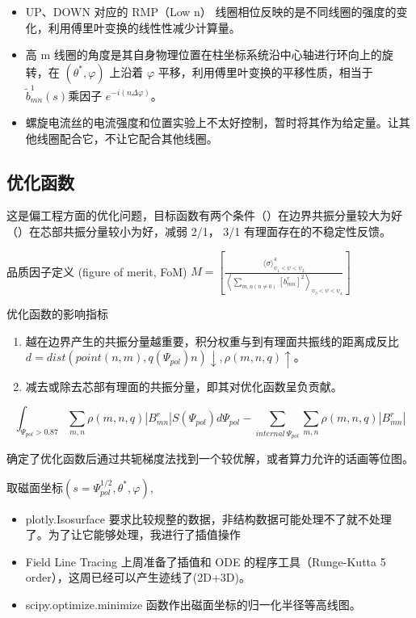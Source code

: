   \begin{itemize}
    \item UP、DOWN 对应的 RMP（Low n） 线圈相位反映的是不同线圈的强度的变化，利用傅里叶变换的线性性减少计算量。
    \item 高 m 线圈的角度是其自身物理位置在柱坐标系统沿中心轴进行环向上的旋转，在 $(\theta^*, \varphi)$ 上沿着 $\varphi$ 平移，利用傅里叶变换的平移性质，相当于$\tilde{b}_{m n}^{1}(s)$乘因子 $e^{-i\left(n \Delta\varphi \right )}$。
    \item 螺旋电流丝的电流强度和位置实验上不太好控制，暂时将其作为给定量。让其他线圈配合它，不让它配合其他线圈。 
  \end{itemize}  
  


\subsection{优化函数}

    
    这是偏工程方面的优化问题，目标函数有两个条件（）在边界共振分量较大为好（）在芯部共振分量较小为好，减弱 2/1， 3/1 有理面存在的不稳定性反馈。
    
  品质因子定义 (figure of merit, FoM) $M=\left[\frac{\langle\sigma\rangle_{\psi_{1}<\psi<\psi_{2}}^{4}}{\left\langle\sum_{m, n(n \neq 0)}\left[b_{m n}^{r}\right]^{2}\right\rangle_{\psi_{3}<\psi<\psi_{4}}}\right]$
    
  优化函数的影响指标
  \begin{enumerate}
    \item 越在边界产生的共振分量越重要，积分权重与到有理面共振线的距离成反比 $d=dist(point(n,m),q(\Psi_{pol})n)\downarrow, \rho(m,n,q) \uparrow$。
    \item 减去或除去芯部有理面的共振分量，即其对优化函数呈负贡献。
  \end{enumerate}
    
  \begin{equation}
    \int_{\Psi_{pol}>0.87} \sum_{m,n} \rho(m,n,q) |B_{mn}^r| S(\Psi_{pol})d\Psi_{pol} - \sum_{internal~\Psi_{pol}} \sum_{m,n} \rho(m,n,q) |B_{mn}^r|
  \end{equation}
  
  确定了优化函数后通过共轭梯度法找到一个较优解，或者算力允许的话画等位图。
  
    
  取磁面坐标$(s=\Psi^{1/2}_{pol},\theta^*,\varphi)$,


    
\begin{itemize}
    \item plotly.Isosurface 要求比较规整的数据，非结构数据可能处理不了就不处理了。为了让它能够处理，我进行了插值操作
    \item Field Line Tracing 上周准备了插值和 ODE 的程序工具（Runge-Kutta 5 order），这周已经可以产生迹线了(2D+3D)。
    \item scipy.optimize.minimize 函数作出磁面坐标的归一化半径等高线图。
\end{itemize}

